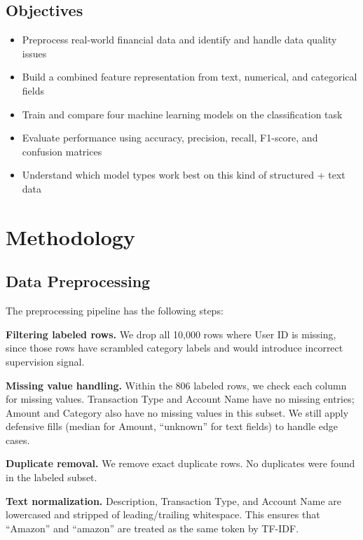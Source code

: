 \documentclass[11pt]{article}
\begin{document}
\subsection{Objectives}

\begin{itemize}
  \item Preprocess real-world financial data and identify and handle data quality issues
  \item Build a combined feature representation from text, numerical, and categorical fields
  \item Train and compare four machine learning models on the classification task
  \item Evaluate performance using accuracy, precision, recall, F1-score, and confusion matrices
  \item Understand which model types work best on this kind of structured + text data
\end{itemize}

\section{Methodology}

\subsection{Data Preprocessing}
\label{sec:preprocessing}

The preprocessing pipeline has the following steps:

\textbf{Filtering labeled rows.} We drop all 10,000 rows where User ID is missing, since those rows have scrambled category labels and would introduce incorrect supervision signal.

\textbf{Missing value handling.} Within the 806 labeled rows, we check each column for missing values. Transaction Type and Account Name have no missing entries; Amount and Category also have no missing values in this subset. We still apply defensive fills (median for Amount, ``unknown'' for text fields) to handle edge cases.

\textbf{Duplicate removal.} We remove exact duplicate rows. No duplicates were found in the labeled subset.

\textbf{Text normalization.} Description, Transaction Type, and Account Name are lowercased and stripped of leading/trailing whitespace. This ensures that ``Amazon'' and ``amazon'' are treated as the same token by TF-IDF.
\end{document}
